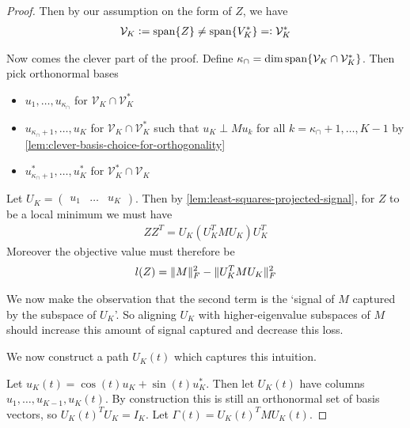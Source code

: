 \begin{proof}
    Then by our assumption on the form of $Z$, we have
    \begin{align*}
        \mathcal{V}_K \vcentcolon= {\operatorname{span}\{{Z}\}} \neq {\operatorname{span}\{{V_K^*}\}} =\vcentcolon \mathcal{V}^*_K
    \end{align*}

    Now comes the clever part of the proof.
    Define $\kappa_\cap = \operatorname{dim}{\operatorname{span}\{{\mathcal{V}_K \cap \mathcal{V}_K^*}\}}$. Then pick orthonormal bases
    \begin{itemize}
        \item $u_1, \dots, u_{\kappa_\cap}$ for $\mathcal{V}_K \cap \mathcal{V}_K^*$
        \item $u_{\kappa_\cap + 1}, \dots, u_K$ for $\mathcal{V}_K \cap \mathcal{V}_K^*$ such that $u_K \perp M u_k$ for all $k = \kappa_\cap + 1, \dots, K-1$ by \cref{lem:clever-basis-choice-for-orthogonality}
        \item $u^*_{\kappa_\cap + 1}, \dots, u^*_K$ for $\mathcal{V}_K^* \cap \mathcal{V}_K$
    \end{itemize}

    Let $U_K = \begin{pmatrix}u_1 & \dots & u_K\end{pmatrix}$.
    Then by \cref{lem:least-squares-projected-signal}, for $Z$ to be a local minimum we must have
    \begin{align*}
        Z Z^T = U_K (U_K^T M U_K) U_K^T
    \end{align*}
    Moreover the objective value must therefore be
    \begin{align}\label{eq:objective-decreases-as-signal-increases}
    l(Z) = \lVert M\rVert_F^2 - \lVert U_K^T M U_K\rVert_F^2
    \end{align}

    We now make the observation that the second term is the `signal of $M$ captured by the subspace of $U_K$'.
    So aligning $U_K$ with higher-eigenvalue subspaces of $M$ should increase this amount of signal captured and decrease this loss.

    We now construct a path $U_K(t)$ which captures this intuition.

    Let $u_K(t) = \cos(t) u_K + \sin(t) u^*_K$.
    Then let $U_K(t)$ have columns $u_1, \dots, u_{K-1}, u_K(t)$.
    By construction this is still an orthonormal set of basis vectors, so $U_K(t)^T U_K = I_K$.
    Let $\Gamma(t) = U_K(t)^T M U_K(t)$.


\end{proof}
